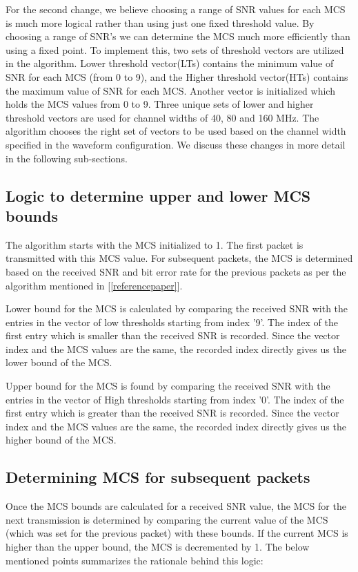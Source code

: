 \documentclass[a4paper, 10pt, conference]{ieeeconf}
\begin{document}
For the second change, we believe choosing a range of SNR values for each MCS is much more logical rather than using just one fixed threshold value. By choosing a range of SNR's we can determine the MCS much more efficiently than using a fixed point. To implement this, two sets of threshold vectors are utilized in the algorithm. Lower threshold vector(LTs) contains the minimum value of SNR for each MCS (from 0 to 9), and the Higher threshold vector(HTs) contains the maximum value of SNR for each MCS. Another vector is initialized which holds the MCS values from 0 to 9. Three unique sets of lower and higher threshold vectors are used for channel widths of 40, 80 and 160 MHz. The algorithm chooses the right set of vectors to be used based on the channel width specified in the waveform configuration.
We discuss these changes in more detail in the following sub-sections.

\subsection{Logic to determine upper and lower MCS bounds}

The algorithm starts with the MCS initialized to 1. The first packet is transmitted with this MCS value. For subsequent packets, the MCS is determined based on the received SNR and bit error rate for the previous packets as per the algorithm mentioned in [\ref{referencepaper}].

Lower bound for the MCS is calculated by comparing the received SNR with the entries in the vector of low thresholds starting from index '9'. The index of the first entry which is smaller than the received SNR is recorded. Since the vector index and the MCS values are the same, the recorded index directly gives us the lower bound of the MCS.

Upper bound for the MCS is found by comparing the received SNR with the entries in the vector of High thresholds starting from index '0'. The index of the first entry which is greater than the received SNR is recorded. Since the vector index and the MCS values are the same, the recorded index directly gives us the higher bound of the MCS.  

\subsection{Determining MCS for subsequent packets}

Once the MCS bounds are calculated for a received SNR value, the MCS for the next transmission is determined by comparing the current value of the MCS (which was set for the previous packet) with these bounds. If the current MCS is higher than the upper bound, the MCS is decremented by 1. The below mentioned points summarizes the rationale behind this logic:
\end{document}
